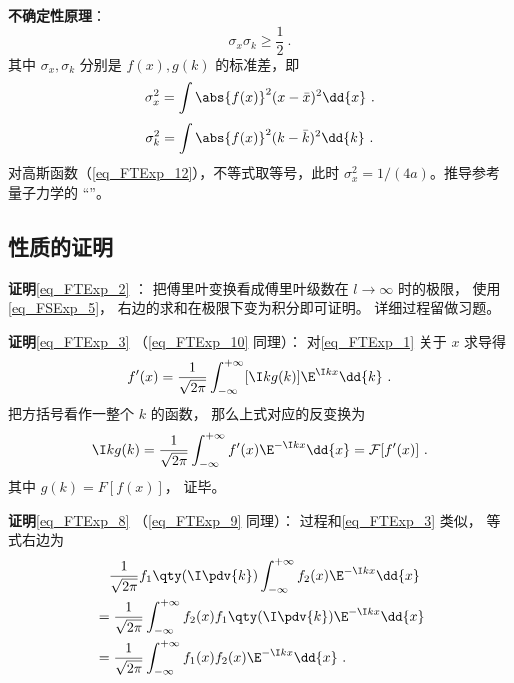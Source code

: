 \textbf{不确定性原理}：
\begin{equation}
\sigma_x \sigma_k \geqslant \frac{1}{2}~.
\end{equation}
其中 $\sigma_x, \sigma_k$ 分别是 $f(x), g(k)$ 的标准差，即
\begin{equation}
\sigma_x^2 = \int \abs{f(x)}^2 (x-\bar x)^2 \dd{x}~.
\end{equation}
\begin{equation}
\sigma_k^2 = \int \abs{f(x)}^2 (k-\bar k)^2 \dd{k}~.
\end{equation}
对高斯函数（\autoref{eq_FTExp_12}），不等式取等号，此时 $\sigma_x^2 = 1/(4a)$。推导参考量子力学的 “”。

\subsection{性质的证明}

\textbf{证明}\autoref{eq_FTExp_2} ： 把傅里叶变换看成傅里叶级数在 $l \to \infty$ 时的极限， 使用\autoref{eq_FSExp_5}， 右边的求和在极限下变为积分即可证明。 详细过程留做习题。

\textbf{证明}\autoref{eq_FTExp_3} （\autoref{eq_FTExp_10} 同理）： 对\autoref{eq_FTExp_1} 关于 $x$ 求导得
\begin{equation}
f'(x) = \frac{1}{\sqrt{2\pi }} \int_{-\infty }^{+\infty } [\I kg(k)]\E^{\I kx} \dd{k}~.
\end{equation}
把方括号看作一整个 $k$ 的函数， 那么上式对应的反变换为
\begin{equation}
\I kg(k) = \frac{1}{\sqrt{2\pi }} \int_{-\infty }^{+\infty } f'(x) \E^{-\I kx} \dd{x} = \mathcal F [f'(x)]~.
\end{equation}
其中 $g(k) = F [f(x)]$， 证毕。

\textbf{证明}\autoref{eq_FTExp_8} （\autoref{eq_FTExp_9} 同理）： 过程和\autoref{eq_FTExp_3} 类似， 等式右边为
\begin{equation}
\begin{aligned}
& \quad \frac{1}{\sqrt{2\pi }} f_1\qty(\I \pdv{k}) \int_{-\infty }^{+\infty } f_2(x)\E^{-\I kx} \dd{x}\\
&= \frac{1}{\sqrt{2\pi }} \int_{-\infty }^{+\infty } f_2(x) f_1\qty(\I \pdv{k})\E^{-\I kx} \dd{x}\\
&= \frac{1}{\sqrt{2\pi }} \int_{-\infty }^{+\infty } f_1(x) f_2(x) \E^{-\I kx} \dd{x}~.
\end{aligned}
\end{equation}
